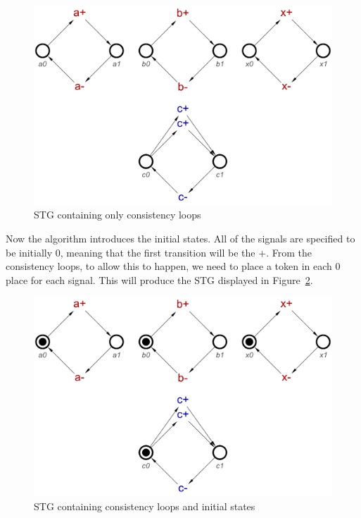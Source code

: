 \documentclass[british,conference,compsoc]{IEEEtran}
\begin{document}
\begin{figure}[h]
\begin{centering}
\includegraphics[scale=0.25]{Images/or-gate-ctrl-loops-stg}
\par\end{centering}
\protect\caption{\label{fig:loops} STG containing only consistency loops}
\end{figure}

Now the algorithm introduces the initial states. All of the signals are specified
to be initially 0, meaning that the first transition will be the $+$. From the
consistency loops, to allow this to happen, we need to place a token in each 
$0$ place for each signal. This will produce the STG displayed in Figure~\ref{fig:tokens}.


\begin{figure}[h]
\begin{centering}
\includegraphics[scale=0.25]{Images/or-gate-ctrl-inits-stg}
\par\end{centering}
\protect\caption{\label{fig:tokens} STG containing consistency loops and initial states}
\end{figure}
\end{document}
